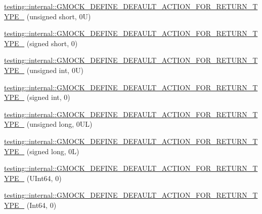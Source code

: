 \begin{DoxyCompactItemize}
\item 
\mbox{\hyperlink{namespacetesting_1_1internal_ab2965a6078670393812e67f8e5fcb072}{testing\+::internal\+::\+G\+M\+O\+C\+K\+\_\+\+D\+E\+F\+I\+N\+E\+\_\+\+D\+E\+F\+A\+U\+L\+T\+\_\+\+A\+C\+T\+I\+O\+N\+\_\+\+F\+O\+R\+\_\+\+R\+E\+T\+U\+R\+N\+\_\+\+T\+Y\+P\+E\+\_\+}} (unsigned short, 0\+U)
\item 
\mbox{\hyperlink{namespacetesting_1_1internal_ae6ea5db83b290e2412f321c3b1eb8c47}{testing\+::internal\+::\+G\+M\+O\+C\+K\+\_\+\+D\+E\+F\+I\+N\+E\+\_\+\+D\+E\+F\+A\+U\+L\+T\+\_\+\+A\+C\+T\+I\+O\+N\+\_\+\+F\+O\+R\+\_\+\+R\+E\+T\+U\+R\+N\+\_\+\+T\+Y\+P\+E\+\_\+}} (signed short, 0)
\item 
\mbox{\hyperlink{namespacetesting_1_1internal_a4285332d8eae4bdfffc13b6c05252c30}{testing\+::internal\+::\+G\+M\+O\+C\+K\+\_\+\+D\+E\+F\+I\+N\+E\+\_\+\+D\+E\+F\+A\+U\+L\+T\+\_\+\+A\+C\+T\+I\+O\+N\+\_\+\+F\+O\+R\+\_\+\+R\+E\+T\+U\+R\+N\+\_\+\+T\+Y\+P\+E\+\_\+}} (unsigned int, 0\+U)
\item 
\mbox{\hyperlink{namespacetesting_1_1internal_a200a33af38e17df617883567c4fd96ab}{testing\+::internal\+::\+G\+M\+O\+C\+K\+\_\+\+D\+E\+F\+I\+N\+E\+\_\+\+D\+E\+F\+A\+U\+L\+T\+\_\+\+A\+C\+T\+I\+O\+N\+\_\+\+F\+O\+R\+\_\+\+R\+E\+T\+U\+R\+N\+\_\+\+T\+Y\+P\+E\+\_\+}} (signed int, 0)
\item 
\mbox{\hyperlink{namespacetesting_1_1internal_a1f4167b954a7ff0074ce8a5bb855f86f}{testing\+::internal\+::\+G\+M\+O\+C\+K\+\_\+\+D\+E\+F\+I\+N\+E\+\_\+\+D\+E\+F\+A\+U\+L\+T\+\_\+\+A\+C\+T\+I\+O\+N\+\_\+\+F\+O\+R\+\_\+\+R\+E\+T\+U\+R\+N\+\_\+\+T\+Y\+P\+E\+\_\+}} (unsigned long, 0\+U\+L)
\item 
\mbox{\hyperlink{namespacetesting_1_1internal_ad8804e25537427755c324ab03a72e776}{testing\+::internal\+::\+G\+M\+O\+C\+K\+\_\+\+D\+E\+F\+I\+N\+E\+\_\+\+D\+E\+F\+A\+U\+L\+T\+\_\+\+A\+C\+T\+I\+O\+N\+\_\+\+F\+O\+R\+\_\+\+R\+E\+T\+U\+R\+N\+\_\+\+T\+Y\+P\+E\+\_\+}} (signed long, 0\+L)
\item 
\mbox{\hyperlink{namespacetesting_1_1internal_ad2efcdbd12c7c020745b87bcc0997809}{testing\+::internal\+::\+G\+M\+O\+C\+K\+\_\+\+D\+E\+F\+I\+N\+E\+\_\+\+D\+E\+F\+A\+U\+L\+T\+\_\+\+A\+C\+T\+I\+O\+N\+\_\+\+F\+O\+R\+\_\+\+R\+E\+T\+U\+R\+N\+\_\+\+T\+Y\+P\+E\+\_\+}} (U\+Int64, 0)
\item 
\mbox{\hyperlink{namespacetesting_1_1internal_ab427739121a380a7934bda96153f053d}{testing\+::internal\+::\+G\+M\+O\+C\+K\+\_\+\+D\+E\+F\+I\+N\+E\+\_\+\+D\+E\+F\+A\+U\+L\+T\+\_\+\+A\+C\+T\+I\+O\+N\+\_\+\+F\+O\+R\+\_\+\+R\+E\+T\+U\+R\+N\+\_\+\+T\+Y\+P\+E\+\_\+}} (Int64, 0)

\end{DoxyCompactItemize}
